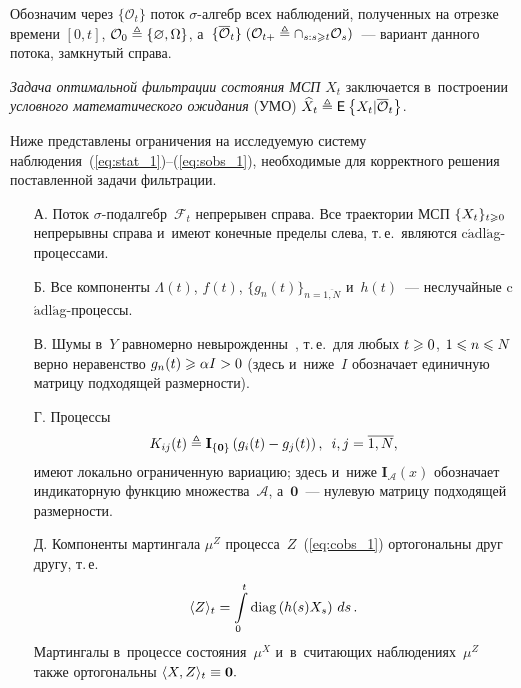 \begin{multicols}{2}
  Обозначим через $\{\mathcal{O}_t\}$ поток $\sigma$-ал\-гебр всех наблюдений,
полученных на отрезке времени $[0,t]$, $\mathcal{O}_0 \hm\triangleq \{\varnothing,\Omega\}$, 
а~$\{\overline{\mathcal{O}}_t\}\; (\mathcal{O}_{t+} \hm\triangleq \cap_{s: s\geqslant t} \mathcal{O}_s)$~--- 
вариант данного потока, замкнутый справа.

\textit{Задача оптимальной фильтрации состояния МСП} $X_t$ заключается в~построении 
\textit{условного математического ожидания} (УМО) $\widehat{X}_t 
\hm\triangleq \me{}{X_t|\overline{\mathcal{O}}_t}$.

Ниже представлены ограничения на ис\-сле\-ду\-емую систему наблюдения~(\ref{eq:stat_1})--(\ref{eq:sobs_1}), 
необходимые для корректного решения поставленной задачи фильтрации.
\begin{itemize}
   \item[А.]
  Поток $\sigma$-под\-ал\-гебр~$\mathcal{F}_t$ непрерывен справа.
  Все траектории МСП $\{X_t\}_{t \hm\geqslant 0}$
  непрерывны справа и~имеют конечные пределы слева, т.\,е.\ являются 
  {c$\acute{\mbox{a}}$dl$\acute{\mbox{a}}$g-про\-цес\-сами}.
  \item[Б.]
  Все компоненты $\Lambda(t)$, $f(t)$, $\{g_n(t)\}_{n=\overline{1,N}}$ и~$h(t)$~--- 
  неслучайные {c$\acute{\mbox{a}}$dl$\acute{\mbox{a}}$g}-про\-цессы.
  \item[В.]
  Шумы в~$Y$ равномерно невырожденны~\cite{LSh_1_01}, т.\,е.\ для любых
   $t \hm\geqslant 0$, $1 \leqslant n \hm\leqslant N$ верно неравенство
  $g_n(t) \hm\geqslant \alpha I \hm > 0$ (здесь и~ниже~$I$ обозначает единичную матрицу подходящей размерности).
  \item[Г.]
  Процессы
  \begin{equation}
  K_{ij}(t) \triangleq \mathbf{I}_{\{\mathbf{0}\}}\left(g_i(t)-g_j(t)\right),\enskip  i,j=\overline{1,N},
  \label{eq:K_def}
  \end{equation}
  имеют локально ограниченную вариацию;
  здесь и~ниже $\mathbf{I}_{\mathcal{A}}(x)$ обозначает индикаторную функцию множества~$\mathcal{A}$, 
  а~$\mathbf{0}$~--- нулевую матрицу подходящей размерности.
  \item[Д.] Компоненты мартингала $\mu^{Z}$ процесса~$Z$~(\ref{eq:cobs_1}) ортогональны друг другу, т.\,е.\
  $$
  \langle   Z   \rangle_t \hm= \int\limits_0^t \mathrm{diag}\left( h(s)X_s\right)\,ds\,.
  $$
  Мартингалы в~процессе состояния~$\mu^{X}$ и~в~считающих наблюдениях~$\mu^{Z}$ также ортогональны
  $\langle   X,Z   \rangle_t \hm\equiv \mathbf{0}.$
\end{itemize}


\end{multicols}
